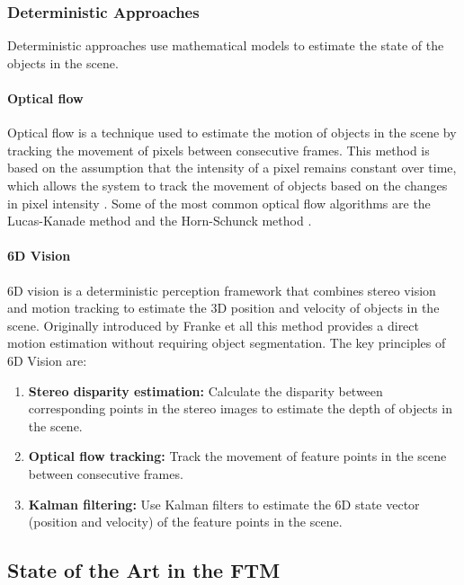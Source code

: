 \subsubsection{Deterministic Approaches}

Deterministic approaches use mathematical models to estimate the state of the objects in the scene. 

\paragraph{Optical flow}

Optical flow is a technique used to estimate the motion of objects in the scene by tracking the movement of pixels between consecutive frames.
This method is based on the assumption that the intensity of a pixel remains constant over time, which allows the system to track the movement
of objects based on the changes in pixel intensity \cite{optical_flow_estimation_survey}. Some of the most common optical flow algorithms are the 
Lucas-Kanade method \cite{flow_lucas_kanade} and the Horn-Schunck method \cite{flow_schunck}.


\paragraph{6D Vision}

6D vision is a deterministic perception framework that combines stereo vision and motion tracking to estimate the 3D position and velocity
of objects in the scene. Originally introduced by Franke et all \cite{6d_vision_daimler} this method provides a direct
motion estimation without requiring object segmentation. The key principles of 6D Vision are: 

\begin{enumerate}
  \item \textbf{Stereo disparity estimation:} Calculate the disparity between corresponding points in the stereo images to estimate the depth of objects in the scene.
  \item \textbf{Optical flow tracking:} Track the movement of feature points in the scene between consecutive frames.
  \item \textbf{Kalman filtering:} Use Kalman filters to estimate the 6D state vector (position and velocity) of the feature points in the scene.
\end{enumerate}




\subsection{State of the Art in the FTM}

